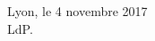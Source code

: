 %
%
%







%
%
%
%
%
%
%
%
%
%
%
%
%
%
%
% 
%



\bigskip
 \bigskip

\begin{flushright}
Lyon, le 4 novembre 2017\\
LdP.
\end{flushright}
